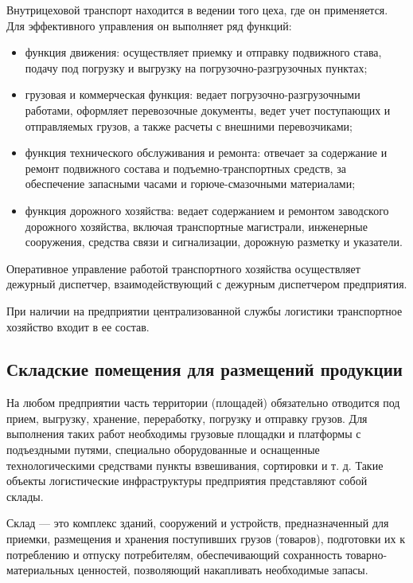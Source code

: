 Внутрицеховой транспорт находится в ведении того цеха, где он применяется. Для эффективного управления он выполняет ряд функций:

\begin{itemize}
    \item функция движения: осуществляет приемку и отправку подвижного става, подачу под погрузку и выгрузку на погрузочно-разгрузочных пунктах;
    \item грузовая и коммерческая функция: ведает погрузочно-разгрузочными работами, оформляет перевозочные документы, ведет учет поступающих и отправляемых грузов, а также расчеты с внешними перевозчиками;
    \item функция технического обслуживания и ремонта: отвечает за содержание и ремонт подвижного состава и подъемно-транспортных средств, за обеспечение запасными часами и горюче-смазочными материалами;
    \item функция дорожного хозяйства: ведает содержанием и ремонтом заводского дорожного хозяйства, включая транспортные магистрали, инженерные сооружения, средства связи и сигнализации, дорожную разметку и указатели.
\end{itemize}

Оперативное управление работой транспортного хозяйства осуществляет дежурный диспетчер, взаимодействующий с дежурным диспетчером предприятия.

При наличии на предприятии централизованной службы логистики транспортное хозяйство входит в ее состав. 

\subsection{Складские помещения для размещений продукции}

На любом предприятии часть территории (площадей) обязательно отводится под прием, выгрузку, хранение, переработку, погрузку и отправку грузов. Для выполнения таких работ необходимы грузовые площадки и платформы с подъездными путями, специально оборудованные и оснащенные технологическими средствами пункты взвешивания, сортировки и т. д. Такие объекты логистические инфраструктуры предприятия представляют собой склады.

Склад --- это комплекс зданий, сооружений и устройств, предназначенный для приемки, размещения и хранения поступивших грузов (товаров), подготовки их к потреблению и отпуску потребителям, обеспечивающий сохранность товарно-материальных ценностей, позволяющий накапливать необходимые запасы.

